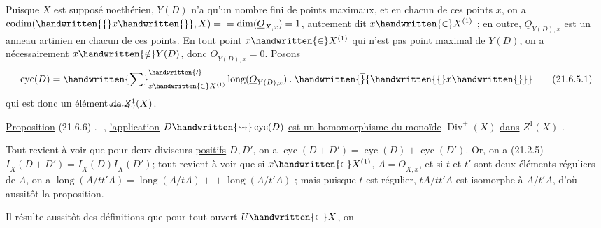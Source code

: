 Puisque $X$ est supposé noethérien, $Y(D)$ n'a qu'un nombre fini de points maximaux, et en chacun de ces points $x$, on a $\operatorname{codim}(\handwritten{\{}x\handwritten{\}},X)={}\allowbreak{}=\operatorname{dim}(\underline O_{X,x})=1$, autrement dit $x\handwritten{\in}X^{(1)}$ ;
\normalmarginpar
{} en outre, $\underline O_{Y(D),x}$ est un anneau \uline{artinien} en chacun de ces points. En tout point $x\handwritten{\in}X^{(1)}$ qui n'est pas point maximal de $Y(D)$, on a nécessairement $x\handwritten{\notin}Y(D)$, donc $\underline O_{Y(D),x}=0$. Posons
\[
  \operatorname{cyc}(D)=\handwritten{\sum}^{\handwritten{\prime}}_{x\handwritten{\in}X^{(1)}}
  \operatorname{long}(\underline O_{Y(D),x})\mathbin{.}\handwritten{\overline}{\handwritten{\{}x\handwritten{\}}}
  \tag*{(21.6.5.1)}
\]
qui est donc un élément de $Z^{1}\llap{\raisebox{-.12ex}[0pt][0pt]{\tiny\unsure{.}}}(X)$.

\uline{Proposition} (21.6.6) .- , \uline{'application} $D\handwritten{\leadsto}\operatorname{cyc}(D)$\deleted{\unsure{;}} \uline{est un homomorphisme du monoïde} $\operatorname{Div}^{+}(X)$ \uline{dans} $Z^{1}(X)$ .

Tout revient à voir que pour deux diviseurs \uline{positifs} $D,D'$, on a $\operatorname{cyc}(D+D')=\operatorname{cyc}(D)+\operatorname{cyc}(D')$. Or, on a (21.2.5) $\underline I_{X}(D+D')=\underline I_{X}(D)\underline I_{X}(D')$; tout revient à voir que si $x\handwritten{\in}X^{(1)}$,  $A=\underline O_{X,x}$, et si $t$ et $t'$ sont deux éléments réguliers de $A$, on a $\operatorname{long}(A/tt'A)=\operatorname{long}(A/tA)+{}\allowbreak{}+\operatorname{long}(A/t'A)$ ; mais puisque  $t$ est régulier, $tA/tt'A$ est isomorphe à $A/t'A$, d'où  aussitôt la proposition.

Il résulte aussitôt des définitions que pour tout ouvert $U\handwritten{\subset}X$, on
